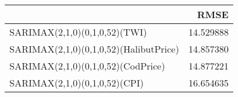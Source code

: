 \begin{tabular}{lr}
\toprule
 & RMSE \\
\midrule
SARIMAX(2,1,0)(0,1,0,52)(TWI) & 14.529888 \\
SARIMAX(2,1,0)(0,1,0,52)(HalibutPrice) & 14.857380 \\
SARIMAX(2,1,0)(0,1,0,52)(CodPrice) & 14.877221 \\
SARIMAX(2,1,0)(0,1,0,52)(CPI) & 16.654635 \\
\bottomrule
\end{tabular}
